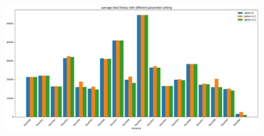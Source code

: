 \documentclass[a4paper,12pt]{article}
\begin{document}
\begin{figure}[H]
\centering
\includegraphics[width=17cm]{graphics/min 2.png}
\end{figure}

\newpage
\end{document}
